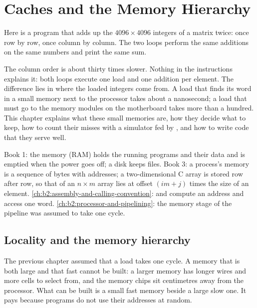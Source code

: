\chapter{Caches and the Memory Hierarchy}\label{ch:b2:caches}

Here is a program that adds up the $4096 \times 4096$ integers of a matrix twice: once row by row, once column by
column. The two loops perform the same additions on the same numbers and print the same sum.


\label{out:b2:caches:hook}

The column order is about thirty times slower. Nothing in the instructions explains it: both loops execute one load
and one addition per element. The difference lies in where the loaded integers come from. A load that finds its word
in a small memory next to the processor takes about a nanosecond; a load that must go to the memory modules on the
motherboard takes more than a hundred. This chapter explains what these small memories are, how they decide what to
keep, how to count their misses with a simulator fed by , and how to write code that they serve well.

\begin{recall}
Book 1: the memory (RAM) holds the running programs and their data and is emptied when the power goes off; a disk
keeps files. Book 3: a process's memory is a sequence of bytes with addresses; a two-dimensional C array is stored
row after row, so that  of an $n \times m$ array lies at offset $(i m + j)$ times the size of an
element. \cref{ch:b2:assembly-and-calling-convention}:  and  compute an address and access one
word. \cref{ch:b2:processor-and-pipelining}: the memory stage of the pipeline was assumed to take one cycle.
\end{recall}

\section{Locality and the memory hierarchy}\label{sec:b2:caches:hierarchy}

The previous chapter assumed that a load takes one cycle. A memory that is both large and that fast cannot be
built: a larger memory has longer wires and more cells to select from, and the memory chips sit centimetres away
from the processor. What can be built is a small fast memory beside a large slow one. It pays because programs do
not use their addresses at random.

